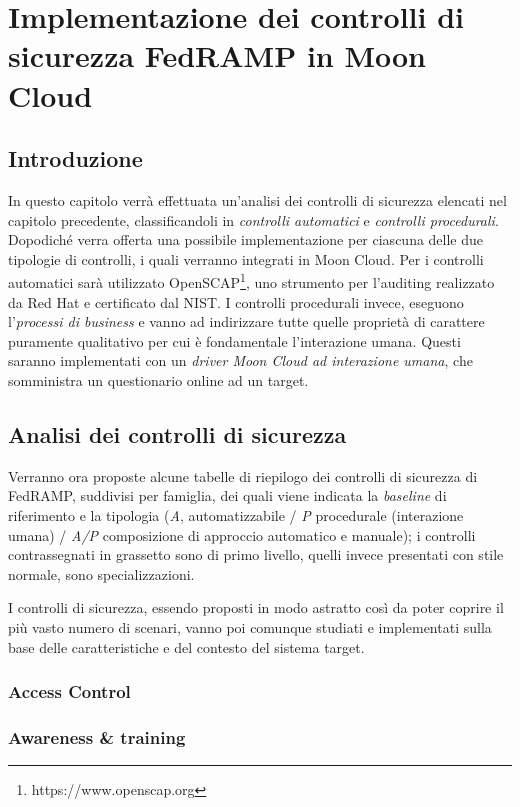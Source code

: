 \documentclass[../main.tex]{subfiles}
\begin{document}
\chapter{Implementazione dei controlli di sicurezza FedRAMP in Moon Cloud}
\section{Introduzione}
In questo capitolo verrà effettuata un'analisi dei controlli di sicurezza elencati nel capitolo precedente, classificandoli in \textit{controlli automatici} e \textit{controlli procedurali}. Dopodiché verra offerta una possibile implementazione per ciascuna delle due tipologie di controlli, i quali verranno integrati in Moon Cloud. Per i controlli automatici sarà utilizzato OpenSCAP\footnote{https://www.openscap.org}, uno strumento per l'auditing realizzato da Red Hat e certificato dal NIST. I controlli procedurali invece, eseguono l'\textit{processi di business} e vanno ad indirizzare tutte quelle proprietà di carattere puramente qualitativo per cui è fondamentale l'interazione umana.
Questi saranno implementati con un \textit{driver Moon Cloud ad interazione umana}, che somministra un questionario online ad un target.

\section{Analisi dei controlli di sicurezza}
Verranno ora proposte alcune tabelle di riepilogo dei controlli di sicurezza di FedRAMP, suddivisi per famiglia, dei quali viene indicata la \textit{baseline} di riferimento e la tipologia (\textit{A}, automatizzabile / \textit{P} procedurale (interazione umana) / \textit{A/P} composizione di approccio automatico e manuale); i controlli contrassegnati in grassetto sono di primo livello, quelli invece presentati con stile normale, sono specializzazioni.

I controlli di sicurezza, essendo proposti in modo astratto così da poter coprire il più vasto numero di scenari, vanno poi comunque studiati e implementati sulla base delle caratteristiche e del contesto del sistema target.
\subsection{Access Control}


\subsection{Awareness \& training}

\end{document}
